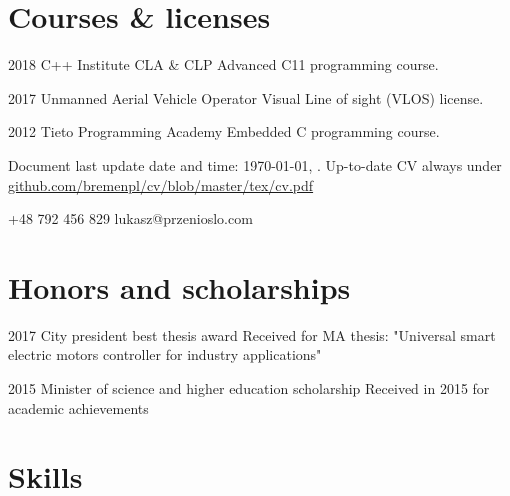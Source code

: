 \documentclass{tccv}
\begin{document}
\section{Courses \& licenses}

\begin{yearlist}

\item{2018}
     {C++ Institute CLA \& CLP}
     {Advanced C11 programming course.}

\item{2017}
     {Unmanned Aerial Vehicle Operator}
     {Visual Line of sight (VLOS) license.}

\item{2012}
     {Tieto Programming Academy}
     {Embedded C programming course.}

\end{yearlist}

\vspace*{\fill} %

{\scriptsize Document last update date and time: \today, \currenttime. Up-to-date CV always under  \href{https://github.com/bremenpl/cv/blob/master/tex/cv.pdf}{github.com/bremenpl/cv/blob/master/tex/cv.pdf}}

    {+48 792 456 829}
    {lukasz@przenioslo.com}
    
\section{Honors and scholarships}

\begin{yearlist}

\item{2017}
     {City president best thesis award}
     {Received for MA thesis: "Universal smart electric motors controller for industry applications"} 
     
\item{2015}
     {Minister of science and higher education scholarship}
     {Received in 2015 for academic achievements} 
    
\end{yearlist}

\section{Skills}
\end{document}
